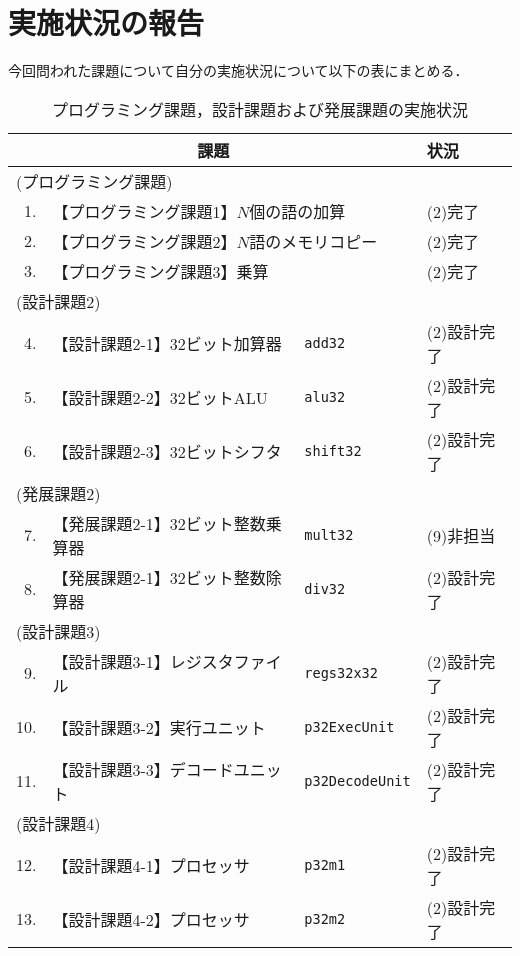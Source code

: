 \documentclass[autodetect-engine,dvi=dvipdfmx,ja=standard,
               a4j,11pt]{bxjsarticle}
\begin{document}
\section{実施状況の報告}
今回問われた課題について自分の実施状況について以下の表にまとめる．
\begin{table}[b]
    \caption{プログラミング課題，設計課題および発展課題の実施状況}
    \label{tab:プログラミング課題，設計課題および発展課題の実施状況}
    \begin{center}
    {\small
    \begin{tabular}{rll|l}
    \hline
    \hline
    \multicolumn{3}{c|}{課題} & 状況 \\
    \hline
    \multicolumn{3}{l|}{(プログラミング課題)} & \\
    1. & \multicolumn{2}{l|}{【プログラミング課題1】$N$個の語の加算 } & (2)完了 \\
    2. & \multicolumn{2}{l|}{【プログラミング課題2】$N$語のメモリコピー} & (2)完了 \\
    3. & \multicolumn{2}{l|}{【プログラミング課題3】乗算} & (2)完了 \\
    \multicolumn{3}{l|}{(設計課題2)} & \\
    4. & 【設計課題2-1】32ビット加算器   & \verb|add32|          & (2)設計完了 \\
    5. & 【設計課題2-2】32ビットALU      & \verb|alu32|          & (2)設計完了 \\
    6. & 【設計課題2-3】32ビットシフタ   & \verb|shift32|        & (2)設計完了 \\
    \multicolumn{3}{l|}{(発展課題2)} & \\
    7. & 【発展課題2-1】32ビット整数乗算器 & \verb|mult32|       & (9)非担当 \\
    8. & 【発展課題2-1】32ビット整数除算器 & \verb|div32|        & (2)設計完了 \\
    \multicolumn{3}{l|}{(設計課題3)} & \\
    9. & 【設計課題3-1】レジスタファイル & \verb|regs32x32|      & (2)設計完了 \\
    10. & 【設計課題3-2】実行ユニット     & \verb|p32ExecUnit|    & (2)設計完了 \\
    11. & 【設計課題3-3】デコードユニット & \verb|p32DecodeUnit|  & (2)設計完了 \\
    \multicolumn{3}{l|}{(設計課題4)} & \\
    12. & 【設計課題4-1】プロセッサ      & \verb|p32m1|          & (2)設計完了 \\
    13. & 【設計課題4-2】プロセッサ      & \verb|p32m2|          & (2)設計完了 \\

\end{tabular}}
\end{center}
\end{table}
\end{document}
